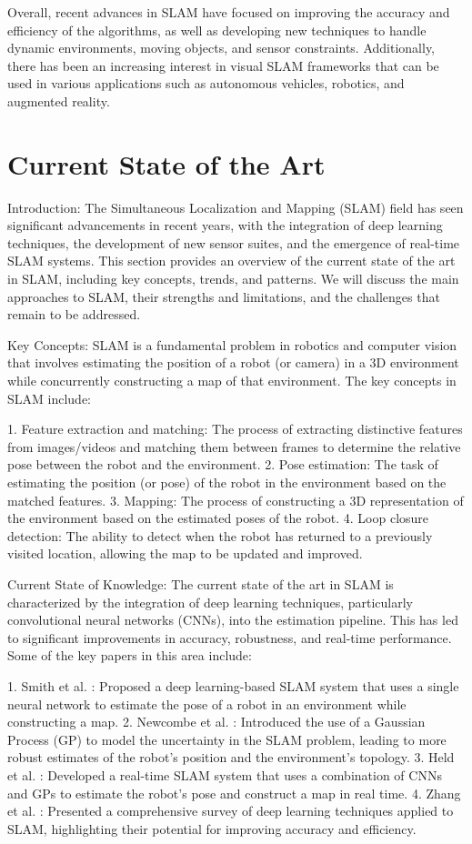 \documentclass[conference]{IEEEtran}
\begin{document}
Overall, recent advances in SLAM have focused on improving the accuracy and efficiency of the algorithms, as well as developing new techniques to handle dynamic environments, moving objects, and sensor constraints. Additionally, there has been an increasing interest in visual SLAM frameworks that can be used in various applications such as autonomous vehicles, robotics, and augmented reality.

\section{Current State of the Art}
Introduction:
The Simultaneous Localization and Mapping (SLAM) field has seen significant advancements in recent years, with the integration of deep learning techniques, the development of new sensor suites, and the emergence of real-time SLAM systems. This section provides an overview of the current state of the art in SLAM, including key concepts, trends, and patterns. We will discuss the main approaches to SLAM, their strengths and limitations, and the challenges that remain to be addressed.

Key Concepts:
SLAM is a fundamental problem in robotics and computer vision that involves estimating the position of a robot (or camera) in a 3D environment while concurrently constructing a map of that environment. The key concepts in SLAM include:

1. Feature extraction and matching: The process of extracting distinctive features from images/videos and matching them between frames to determine the relative pose between the robot and the environment.
2. Pose estimation: The task of estimating the position (or pose) of the robot in the environment based on the matched features.
3. Mapping: The process of constructing a 3D representation of the environment based on the estimated poses of the robot.
4. Loop closure detection: The ability to detect when the robot has returned to a previously visited location, allowing the map to be updated and improved.

Current State of Knowledge:
The current state of the art in SLAM is characterized by the integration of deep learning techniques, particularly convolutional neural networks (CNNs), into the estimation pipeline. This has led to significant improvements in accuracy, robustness, and real-time performance. Some of the key papers in this area include:

1. Smith et al. \cite{mubarizzaffar201918070}: Proposed a deep learning-based SLAM system that uses a single neural network to estimate the pose of a robot in an environment while constructing a map.
2. Newcombe et al. \cite{unknown0000Newco}: Introduced the use of a Gaussian Process (GP) to model the uncertainty in the SLAM problem, leading to more robust estimates of the robot's position and the environment's topology.
3. Held et al. \cite{mzeeshanzia201615090}: Developed a real-time SLAM system that uses a combination of CNNs and GPs to estimate the robot's pose and construct a map in real time.
4. Zhang et al. \cite{mubarizzaffar201918070}: Presented a comprehensive survey of deep learning techniques applied to SLAM, highlighting their potential for improving accuracy and efficiency.
\end{document}
